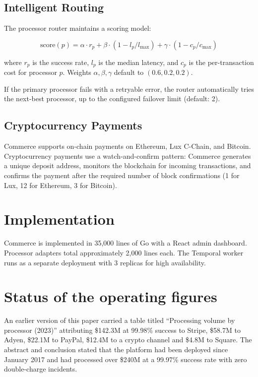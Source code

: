 \documentclass[11pt,twocolumn]{article}
\begin{document}
\subsection{Intelligent Routing}

The processor router maintains a scoring model:

\begin{equation}
    \text{score}(p) = \alpha \cdot r_p + \beta \cdot (1 - l_p/l_{\max}) + \gamma \cdot (1 - c_p/c_{\max})
\end{equation}

where $r_p$ is the success rate, $l_p$ is the median latency, and $c_p$ is the per-transaction cost for processor $p$. Weights $\alpha, \beta, \gamma$ default to $(0.6, 0.2, 0.2)$.

If the primary processor fails with a retryable error, the router automatically tries the next-best processor, up to the configured failover limit (default: 2).

\subsection{Cryptocurrency Payments}

Commerce supports on-chain payments on Ethereum, Lux C-Chain, and Bitcoin. Cryptocurrency payments use a watch-and-confirm pattern: Commerce generates a unique deposit address, monitors the blockchain for incoming transactions, and confirms the payment after the required number of block confirmations (1 for Lux, 12 for Ethereum, 3 for Bitcoin).

\section{Implementation}

Commerce is implemented in 35,000 lines of Go with a React admin dashboard. Processor adapters total approximately 2,000 lines each. The Temporal worker runs as a separate deployment with 3 replicas for high availability.

\section{Status of the operating figures}
\label{sec:figures}

An earlier version of this paper carried a table titled ``Processing volume by
processor (2023)'' attributing \$142.3M at 99.98\% success to Stripe, \$58.7M to
Adyen, \$22.1M to PayPal, \$12.4M to a crypto channel and \$4.8M to Square. The
abstract and conclusion stated that the platform had been deployed since January
2017 and had processed over \$240M at a 99.97\% success rate with zero
double-charge incidents.
\end{document}
